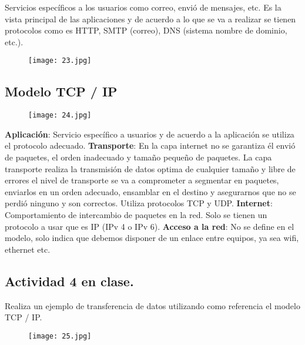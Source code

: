 Servicios específicos a los usuarios como correo, envió de mensajes, etc. Es la vista principal de las aplicaciones y de acuerdo a lo que se va a realizar se tienen protocolos como es HTTP, SMTP (correo), DNS (sistema nombre de dominio, etc.).\hfill \break

\begin{figure}[h!]
		\centering
		{\texttt{[image: 23.jpg]}\par} \vspace{1cm}
\end{figure}
\newpage

\begin{center}
\section{\textbf{Modelo TCP / IP}}
\end{center}

\begin{figure}[h!]
		\centering
		{\texttt{[image: 24.jpg]}\par} \vspace{1cm}
\end{figure}

\textbf{Aplicación}: Servicio específico a usuarios y de acuerdo a la aplicación se utiliza el protocolo adecuado.\hfill \break
\textbf{Transporte}: En la capa internet no se garantiza él envió de paquetes, el orden inadecuado y tamaño pequeño de paquetes. La capa transporte realiza la transmisión de datos optima de cualquier tamaño y libre de errores el nivel de transporte se va a comprometer a segmentar en paquetes, enviarlos en un orden adecuado, ensamblar en el destino y asegurarnos que no se perdió ninguno y son correctos. Utiliza protocolos TCP y UDP.\hfill \break
\textbf{Internet}: Comportamiento de intercambio de paquetes en la red. Solo se tienen un protocolo a usar que es IP (IPv 4 o IPv 6).\hfill \break
\textbf{Acceso a la red}: No se define en el modelo, solo indica que debemos disponer de un enlace entre equipos, ya sea wifi, ethernet etc.
\newpage

{\raggedright
\subsection{Actividad 4 en clase.}
}

Realiza un ejemplo de transferencia de datos utilizando como referencia el modelo TCP / IP.

\begin{figure}[h!]
		\centering
		{\texttt{[image: 25.jpg]}\par} 
\end{figure}

